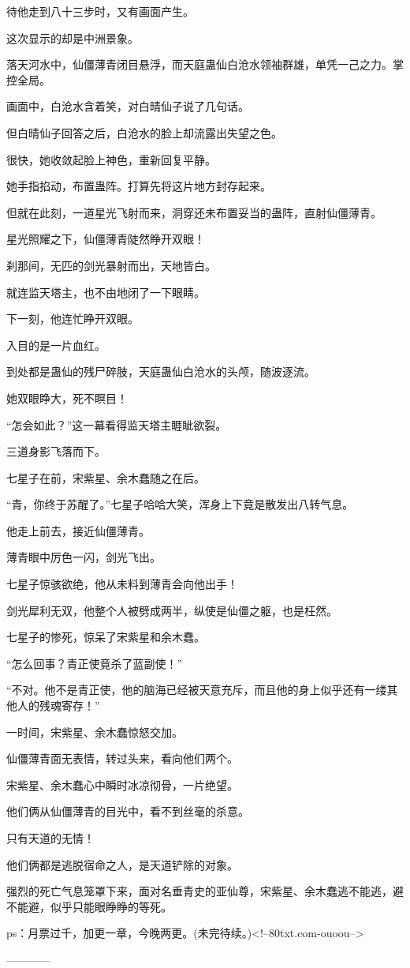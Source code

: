 \begin{this_body}
待他走到八十三步时，又有画面产生。

这次显示的却是中洲景象。

落天河水中，仙僵薄青闭目悬浮，而天庭蛊仙白沧水领袖群雄，单凭一己之力。掌控全局。

画面中，白沧水含着笑，对白晴仙子说了几句话。

但白晴仙子回答之后，白沧水的脸上却流露出失望之色。

很快，她收敛起脸上神色，重新回复平静。

她手指掐动，布置蛊阵。打算先将这片地方封存起来。

但就在此刻，一道星光飞射而来，洞穿还未布置妥当的蛊阵，直射仙僵薄青。

星光照耀之下，仙僵薄青陡然睁开双眼！

刹那间，无匹的剑光暴射而出，天地皆白。

就连监天塔主，也不由地闭了一下眼睛。

下一刻，他连忙睁开双眼。

入目的是一片血红。

到处都是蛊仙的残尸碎肢，天庭蛊仙白沧水的头颅，随波逐流。

她双眼睁大，死不瞑目！

“怎会如此？”这一幕看得监天塔主睚眦欲裂。

三道身影飞落而下。

七星子在前，宋紫星、余木蠢随之在后。

“青，你终于苏醒了。”七星子哈哈大笑，浑身上下竟是散发出八转气息。

他走上前去，接近仙僵薄青。

薄青眼中厉色一闪，剑光飞出。

七星子惊骇欲绝，他从未料到薄青会向他出手！

剑光犀利无双，他整个人被劈成两半，纵使是仙僵之躯，也是枉然。

七星子的惨死，惊呆了宋紫星和余木蠢。

“怎么回事？青正使竟杀了蓝副使！”

“不对。他不是青正使，他的脑海已经被天意充斥，而且他的身上似乎还有一缕其他人的残魂寄存！”

一时间，宋紫星、余木蠢惊怒交加。

仙僵薄青面无表情，转过头来，看向他们两个。

宋紫星、余木蠢心中瞬时冰凉彻骨，一片绝望。

他们俩从仙僵薄青的目光中，看不到丝毫的杀意。

只有天道的无情！

他们俩都是逃脱宿命之人，是天道铲除的对象。

强烈的死亡气息笼罩下来，面对名垂青史的亚仙尊，宋紫星、余木蠢逃不能逃，避不能避，似乎只能眼睁睁的等死。

ps：月票过千，加更一章，今晚两更。(未完待续。)<!--80txt.com-ouoou-->

------------

\end{this_body}

